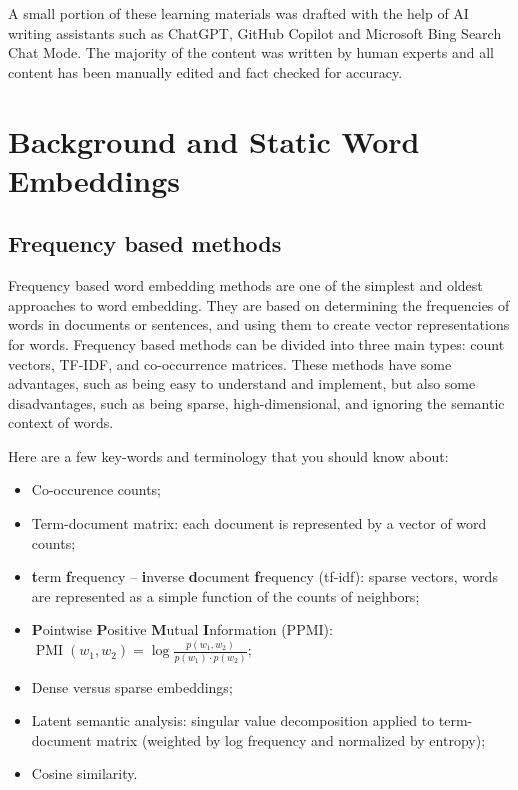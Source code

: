 \documentclass[11pt, a4paper]{amsart}
\begin{document}
A small portion of these learning materials was drafted with the help of AI writing assistants such as ChatGPT, GitHub Copilot and Microsoft Bing Search Chat Mode. The majority of the content was written by human experts and all content has been manually edited and fact checked for accuracy. \\

\section{Background and Static Word Embeddings}
\label{sec:static_word_embeddings}


\subsection{Frequency based methods}

Frequency based word embedding methods are one of the simplest and oldest approaches to word embedding.
They are based on determining the frequencies of words in documents or sentences, and using them to create vector representations for words.
Frequency based methods can be divided into three main types: count vectors, TF-IDF, and co-occurrence matrices.
These methods have some advantages, such as being easy to understand and implement, but also some disadvantages, such as being sparse, high-dimensional, and ignoring the semantic context of words.

Here are a few key-words and terminology that you should know about:
\begin{itemize}
	\item Co-occurence counts;
	\item Term-document matrix: each document is represented by a vector of word counts;
	\item \textbf{t}erm \textbf{f}requency -- \textbf{i}nverse \textbf{d}ocument \textbf{f}requency (tf-idf):
	sparse vectors, words are represented as a simple function of the counts of neighbors;
	\item \textbf{P}ointwise \textbf{P}ositive \textbf{M}utual \textbf{I}nformation (PPMI):
	$\operatorname{PMI}(w_{1}, w_{2}) = \log \frac{p(w_{1}, w_{2})}{p(w_{1}) \cdot p(w_{2})}$;
	\item Dense versus sparse embeddings;
	\item Latent semantic analysis:
	singular value decomposition applied to term-document matrix (weighted by log frequency and normalized by entropy);
	\item Cosine similarity.
\end{itemize}
\end{document}
